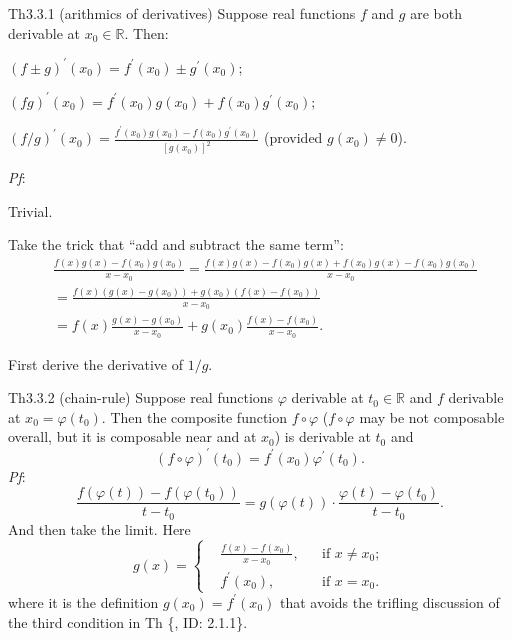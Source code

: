 \documentclass{article}
\begin{document}
\begin{Th}{Th3.3.1 (arithmics of derivatives)}
    Suppose real functions $f$ and $g$ are both derivable at $x_0\in\mathbb{R}$. Then:
    \begin{compactenum}
        \item $(f\pm g)^\prime(x_0) = f^\prime(x_0) \pm g^\prime(x_0)$;
        \item $(fg)^\prime(x_0) = f^\prime(x_0)g(x_0) + f(x_0)g^\prime(x_0)$;
        \item $(f/g)^\prime(x_0) = \frac{f^\prime(x_0)g(x_0) - f(x_0)g^\prime(x_0)}{[g(x_0)]^2}$ (provided $g(x_0)\neq 0$).
    \end{compactenum}
    \tcblower
    \textit{Pf}:
    \begin{compactenum}
        \item Trivial.
        \item Take the trick that ``add and subtract the same term'':
        $$
        \begin{aligned}
            & \frac{f(x)g(x) - f(x_0)g(x_0)}{x-x_0} = \frac{f(x)g(x) - f(x_0)g(x) + f(x_0)g(x) - f(x_0)g(x_0)}{x-x_0} \\
            &= \frac{f(x)(g(x)-g(x_0)) + g(x_0)(f(x)-f(x_0))}{x-x_0} \\
            &= f(x)\frac{g(x)-g(x_0)}{x-x_0} + g(x_0)\frac{f(x)-f(x_0)}{x-x_0}.
        \end{aligned}
        $$
        \item First derive the derivative of $1/g$.
    \end{compactenum}
\end{Th}

\begin{Th}{Th3.3.2 (chain-rule)}
    Suppose real functions $\varphi$ derivable at $t_0\in\mathbb{R}$ and $f$ derivable at $x_0 = \varphi(t_0)$. Then the composite function $f\circ\varphi$ ($f\circ\varphi$ may be not composable overall, but it is composable near and at $x_0$) is derivable at $t_0$ and 
    $$ (f\circ\varphi)^\prime(t_0) = f^\prime(x_0)\varphi^\prime(t_0). $$
    \tcblower
    \textit{Pf}: $$ \frac{f(\varphi(t))-f(\varphi(t_0))}{t-t_0} = g(\varphi(t)) \cdot \frac{\varphi(t)-\varphi(t_0)}{t-t_0}. $$
    And then take the limit. Here
    $$ g(x) = \left\{
        \begin{aligned}
            &\frac{f(x)-f(x_0)}{x-x_0}, && \text{if } x\neq x_0;\\
            &f^\prime(x_0), && \text{if } x = x_0.
        \end{aligned}\right.
    $$
    where it is the definition $g(x_0) = f^\prime(x_0)$ that avoids the trifling discussion of the third condition in Th \{, ID: 2.1.1\}.
\end{Th}
\end{document}

